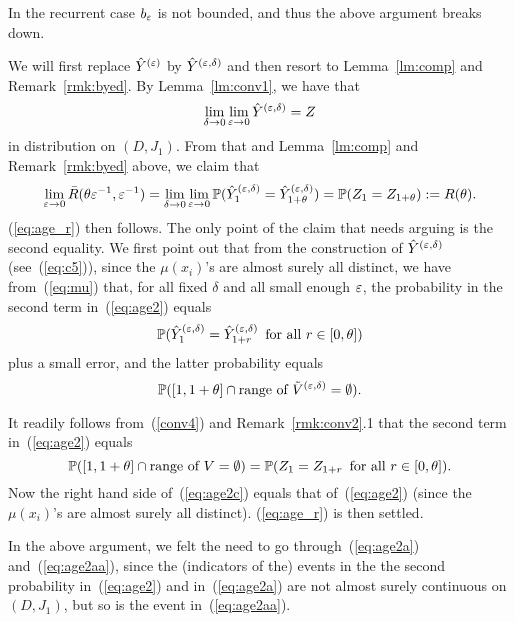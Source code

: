 \begin{rmk}
\label{rmk:trans2}
In the recurrent case $b_\varepsilon$ is not bounded, and thus the above argument breaks down.
\end{rmk}





We will first replace $\hat Y^{(\varepsilon)}$ by $\hat Y^{(\varepsilon,\delta)}$ and then resort to Lemma~\ref{lm:comp} and Remark~\ref{rmk:byed}.
By Lemma~\ref{lm:conv1},
we have that
\begin{equation}
\label{eq:age1} 
\lim_{\delta\to0}\lim_{\eps\to0}\byed=Z
\end{equation}
in distribution on $(D,J_1)$. From that and Lemma~\ref{lm:comp} and Remark~\ref{rmk:byed} above, we claim that
\begin{equation}
\label{eq:age2} 
\lim_{\eps\to0}\bar R(\theta\eps^{-1},\eps^{-1})=\lim_{\delta\to0}\lim_{\eps\to0}\P(\byed_1=\byed_{1+\theta})=\P(Z_1=Z_{1+\theta}):=R(\theta).
\end{equation}
(\ref{eq:age_r}) then follows.  
The only point of the claim that needs arguing is the second equality. 
We first point out that from the construction of $\hat Y^{(\varepsilon,\delta)}$ (see~(\ref{eq:c5})), since the $\mu(x_i)$'s are almost surely all distinct,
we have from~(\ref{eq:mu}) that, for all fixed $\delta$ and all small enough $\varepsilon$, the probability in the second
term in~(\ref{eq:age2}) equals
\begin{equation}
\label{eq:age2a} 
\P(\byed_1=\byed_{1+r}\,\mbox{ for all }r\in[0,\theta])
\end{equation}
plus a small error, and the latter probability equals
\begin{equation}
\label{eq:age2aa} 
\P([1,1+\theta]\cap\mbox{range of }\bved=\emptyset).
\end{equation}

It readily follows from~(\ref{conv4}) and Remark~\ref{rmk:conv2}.1
that the second term in~(\ref{eq:age2}) equals
\begin{equation}
\label{eq:age2c} 
\P([1,1+\theta]\cap\mbox{range of }V=\emptyset)=\P(Z_1=Z_{1+r}\,\mbox{ for all }r\in[0,\theta]).
\end{equation}
Now the right hand side of~(\ref{eq:age2c}) equals that of~(\ref{eq:age2}) (since the $\mu(x_i)$'s are almost surely all distinct).
(\ref{eq:age_r}) is then settled.

In the above argument, we felt the need to go through~(\ref{eq:age2a}) and~(\ref{eq:age2aa}), since the (indicators of the) events in the 
the second probability in~(\ref{eq:age2}) and in~(\ref{eq:age2a}) are not almost surely continuous on $(D,J_1)$, but so is the event
in~(\ref{eq:age2aa}).

